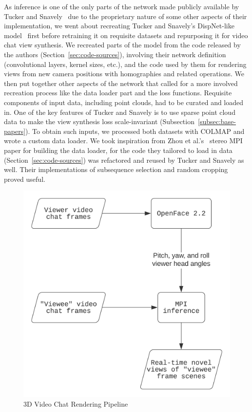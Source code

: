 As inference is one of the only parts of the network made publicly available by Tucker and Snavely~\cite{single_view_mpi} due to the proprietary nature of some other aspects of their implementation, we went about recreating Tucker and Snavely's DispNet-like model~\cite{mayer_large_2016} first before retraining it on requisite datasets and repurposing it for video chat view synthesis. We recreated parts of the model from the code released by the authors (Section~\ref{sec:code-sources}), involving their network definition (convolutional layers, kernel sizes, etc.), and the code used by them for rendering views from new camera positions with homographies and related operations. We then put together other aspects of the network that called for a more involved recreation process like the data loader part and the loss functions. Requisite components of input data, including point clouds, had to be curated and loaded in. One of the key features of Tucker and Snavely is to use sparse point cloud data to make the view synthesis loss scale-invariant (Subsection~\ref{subsec:base-papers}). To obtain such inputs, we processed both datasets with COLMAP and wrote a custom data loader. We took inspiration from Zhou et al.'s~\cite{zhou2018stereo} stereo MPI paper for building the data loader, for the code they tailored to load in data (Section~\ref{sec:code-sources}) was refactored and reused by Tucker and Snavely as well. Their implementations of subsequence selection and random cropping proved useful.

\begin{figure}[!h]
    \includegraphics[width=0.60\columnwidth]{figures/3d-video-chat-rendering-pipeline.png}
    \caption{3D Video Chat Rendering Pipeline}
    \label{fig:3d-video-chat-rendering-pipeline}
\end{figure}

